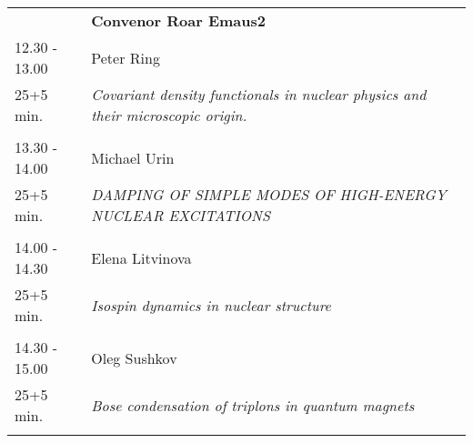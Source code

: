 \begin{longtable}{p{3cm}p{13cm}}
&\hfill {\bf Convenor Roar Emaus2 }\\ 
12.30 - 13.00 & Peter Ring\\ 
25+5 min. & {\it Covariant density functionals in nuclear physics and their microscopic origin.}\\ 
 & \\ 
13.30 - 14.00 & Michael Urin\\ 
25+5 min. & {\it DAMPING OF SIMPLE MODES OF HIGH-ENERGY NUCLEAR EXCITATIONS}\\ 
 & \\ 
14.00 - 14.30 & Elena Litvinova\\ 
25+5 min. & {\it Isospin dynamics in nuclear structure}\\ 
 & \\ 
14.30 - 15.00 & Oleg Sushkov\\ 
25+5 min. & {\it Bose condensation of triplons in quantum magnets}\\ 
 & \\ 
\end{longtable}

